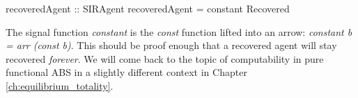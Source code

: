 \begin{HaskellCode}
recoveredAgent :: SIRAgent
recoveredAgent = constant Recovered
\end{HaskellCode}

The signal function \textit{constant} is the \textit{const} function lifted into an arrow: \textit{constant b = arr (const b)}. This should be proof enough that a recovered agent will stay recovered \textit{forever}. We will come back to the topic of computability in pure functional ABS in a slightly different context in Chapter \ref{ch:equilibrium_totality}.